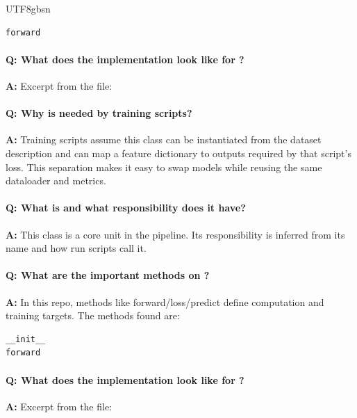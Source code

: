 \documentclass[11pt]{article}
\begin{document}
\begin{CJK*}{UTF8}{gbsn}
\begin{Verbatim}[fontsize=\small]
forward
\end{Verbatim}

\paragraph{Q: What does the implementation look like for \texttt{}?}
\textbf{A:} Excerpt from the file:

\vspace{1mm}


\paragraph{Q: Why is \texttt{} needed by training scripts?}
\textbf{A:} Training scripts assume this class can be instantiated from the dataset description and can map a feature dictionary to outputs required by that script's loss. This separation makes it easy to swap models while reusing the same dataloader and metrics.

\paragraph{Q: What is \texttt{} and what responsibility does it have?}
\textbf{A:} This class is a core unit in the pipeline. Its responsibility is inferred from its name and how run scripts call it.

\paragraph{Q: What are the important methods on \texttt{}?}
\textbf{A:} In this repo, methods like forward/loss/predict define computation and training targets. The methods found are:

\begin{Verbatim}[fontsize=\small]
__init__
forward
\end{Verbatim}

\paragraph{Q: What does the implementation look like for \texttt{}?}
\textbf{A:} Excerpt from the file:


\end{CJK*}
\end{document}
